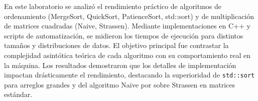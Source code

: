 En este laboratorio se analizó el rendimiento práctico de algoritmos de ordenamiento (MergeSort, QuickSort, PatienceSort, std::sort) y de multiplicación de matrices cuadradas (Naive, Strassen). Mediante implementaciones en C++ y scripts de automatización, se midieron los tiempos de ejecución para distintos tamaños y distribuciones de datos. El objetivo principal fue contrastar la complejidad asintótica teórica de cada algoritmo con su comportamiento real en la máquina. Los resultados demostraron que los detalles de implementación impactan drásticamente el rendimiento, destacando la superioridad de \texttt{std::sort} para arreglos grandes y del algoritmo Naive por sobre Strassen en matrices estándar.
